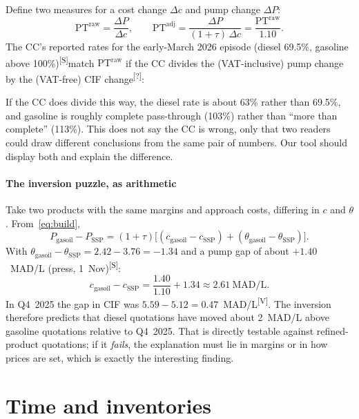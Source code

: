 \documentclass[11pt,a4paper]{article}
\newcommand{\tagV}{\textsuperscript{\textcolor{green!50!black}{\textsf{\scriptsize[V]}}}}
\newcommand{\tagS}{\textsuperscript{\textcolor{orange!80!black}{\textsf{\scriptsize[S]}}}}
\newcommand{\tagQ}{\textsuperscript{\textcolor{red!70!black}{\textsf{\scriptsize[?]}}}}
\theoremstyle{definition}
\newcommand{\MADL}{\text{MAD/L}}
\newcommand{\PT}{\mathrm{PT}}
\begin{document}
Define two measures for a cost change $\Delta c$ and pump change $\Delta P$:
\begin{equation}
\PT^{\mathrm{raw}} = \frac{\Delta P}{\Delta c},\qquad
\PT^{\mathrm{adj}} = \frac{\Delta P}{(1+\tau)\,\Delta c} = \frac{\PT^{\mathrm{raw}}}{1.10}.
\end{equation}
The CC's reported rates for the early-March 2026 episode (diesel 69.5\%, gasoline above 100\%)\tagS match $\PT^{\mathrm{raw}}$ if the CC divides
the (VAT-inclusive) pump change by the (VAT-free) CIF change\tagQ:

\begin{table}[h]
\centering

\caption{Early-March 2026 episode as reported\tagS, raw and VAT-adjusted.}
\end{table}

If the CC does divide this way, the diesel rate is about 63\% rather than 69.5\%, and gasoline is roughly complete pass-through (103\%)
rather than ``more than complete'' (113\%). This does not say the CC is wrong, only that two readers could draw different conclusions
from the same pair of numbers. Our tool should display both and explain the difference.

\subsection{The inversion puzzle, as arithmetic}\label{sec:puzzle}

Take two products with the same margins and approach costs, differing in $c$ and $\theta$. From~\eqref{eq:build},
\[
P_{\text{gasoil}} - P_{\text{SSP}} = (1+\tau)\big[(c_{\text{gasoil}} - c_{\text{SSP}}) + (\theta_{\text{gasoil}}-\theta_{\text{SSP}})\big].
\]
With $\theta_{\text{gasoil}}-\theta_{\text{SSP}} = 2.42 - 3.76 = -1.34$ and a pump gap of about $+1.40$~MAD/L (press, 1~Nov)\tagS:
\[
c_{\text{gasoil}} - c_{\text{SSP}} = \frac{1.40}{1.10} + 1.34 \approx 2.61~\MADL .
\]
In Q4~2025 the gap in CIF was $5.59 - 5.12 = 0.47$~MAD/L\tagV. The inversion therefore predicts that diesel quotations have
moved about 2~MAD/L above gasoline quotations relative to Q4~2025. That is directly testable against refined-product quotations; if it
\emph{fails}, the explanation must lie in margins or in how prices are set, which is exactly the interesting finding.

\part{Time and inventories}
\end{document}
